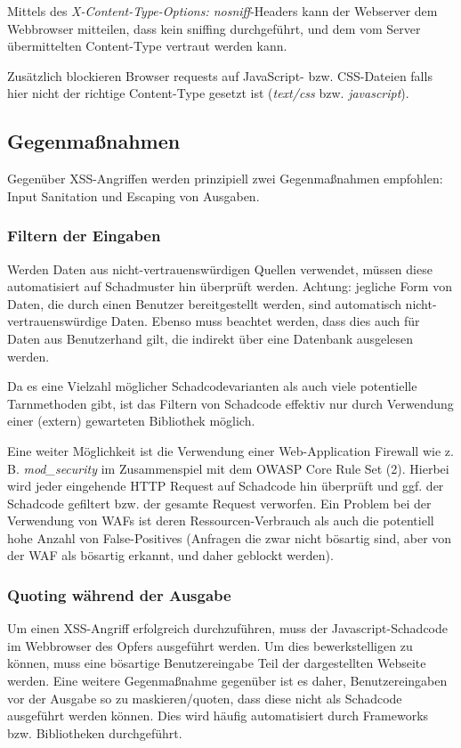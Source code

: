 Mittels des \textit{X-Content-Type-Options: nosniff}-Headers kann der Webserver dem Webbrowser mitteilen, dass kein sniffing durchgeführt, und dem vom Server übermittelten Content-Type vertraut werden kann.

Zusätzlich blockieren Browser requests auf JavaScript- bzw. CSS-Dateien falls hier nicht der richtige Content-Type gesetzt ist (\textit{text/css} bzw. \textit{javascript}).


\subsection{Gegenmaßnahmen}

Gegenüber XSS-Angriffen werden prinzipiell zwei Gegenmaßnahmen empfohlen: Input Sanitation und Escaping von Ausgaben.

\subsubsection{Filtern der Eingaben}

Werden Daten aus nicht-vertrauenswürdigen Quellen verwendet, müssen diese automatisiert auf Schadmuster hin überprüft werden. Achtung: jegliche Form von Daten, die durch einen Benutzer bereitgestellt werden, sind automatisch nicht-vertrauenswürdige Daten. Ebenso muss beachtet werden, dass dies auch für Daten aus Benutzerhand gilt, die indirekt über eine Datenbank ausgelesen werden.

Da es eine Vielzahl möglicher Schadcodevarianten als auch viele potentielle Tarnmethoden gibt, ist das Filtern von Schadcode effektiv nur durch Verwendung einer (extern) gewarteten Bibliothek möglich.

Eine weiter Möglichkeit ist die Verwendung einer Web-Application Firewall wie z. B. \textit{mod\_security} im Zusammenspiel mit dem OWASP Core Rule Set (2). Hierbei wird jeder eingehende HTTP Request auf Schadcode hin überprüft und ggf. der Schadcode gefiltert bzw. der gesamte Request verworfen. Ein Problem bei der Verwendung von WAFs ist deren Ressourcen-Verbrauch als auch die potentiell hohe Anzahl von False-Positives (Anfragen die zwar nicht bösartig sind, aber von der WAF als bösartig erkannt, und daher geblockt werden).

\subsubsection{Quoting während der Ausgabe}

Um einen XSS-Angriff erfolgreich durchzuführen, muss der Javascript-Schadcode im Webbrowser des Opfers ausgeführt werden. Um dies bewerkstelligen zu können, muss eine bösartige Benutzereingabe Teil der dargestellten Webseite werden. Eine weitere Gegenmaßnahme gegenüber ist es daher, Benutzereingaben vor der Ausgabe so zu maskieren/quoten, dass diese nicht als Schadcode ausgeführt werden können. Dies wird häufig automatisiert durch Frameworks bzw. Bibliotheken durchgeführt.

